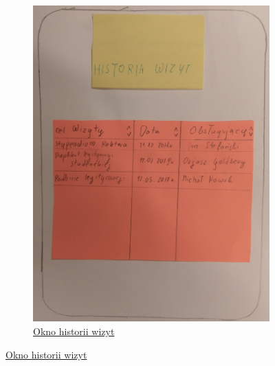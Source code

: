 \documentclass[12pt]{article}
\begin{document}
\begin{figure}[h!]
\begin{subfigure}[ba]{1\linewidth}
	\includegraphics[width=\linewidth]{zdj/8.jpg}
	\caption{\underline{Okno historii wizyt}}
\end{subfigure}
\end{figure}
\end{document}
